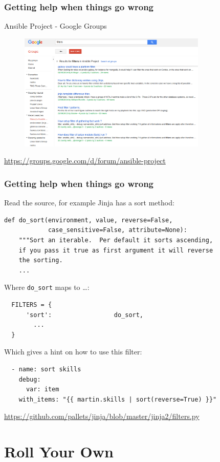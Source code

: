 \documentclass[pdf]{beamer}
\begin{document}
\begin{frame}[fragile]
  \frametitle{Getting help when things go wrong}
  Ansible Project - Google Groups
  \begin{center}
    \begin{figure}
      \includegraphics[width=0.8\textwidth]{ansible-google-group.png}
    \end{figure}
  \end{center}
  \tiny \url{https://groups.google.com/d/forum/ansible-project}
\end{frame}

\begin{frame}[t,fragile]
  \frametitle{Getting help when things go wrong}
  Read the source, for example Jinja has a sort method:
  \begin{verbatim}
def do_sort(environment, value, reverse=False,
            case_sensitive=False, attribute=None):
    """Sort an iterable.  Per default it sorts ascending,
    if you pass it true as first argument it will reverse
    the sorting.
    ...
  \end{verbatim}
  \pause{}
  Where {\color{blue}\texttt{do\_sort}} maps to \ldots {}:
  \begin{verbatim}
  FILTERS = {
      'sort':                 do_sort,
        ...
  }
  \end{verbatim}
  \pause{}
  Which gives a hint on how to use this filter:
  \begin{verbatim}
  - name: sort skills
    debug:
      var: item
    with_items: "{{ martin.skills | sort(reverse=True) }}"
  \end{verbatim}
  \tiny \url{https://github.com/pallets/jinja/blob/master/jinja2/filters.py}
\end{frame}

\section{Roll Your Own}
\end{document}
